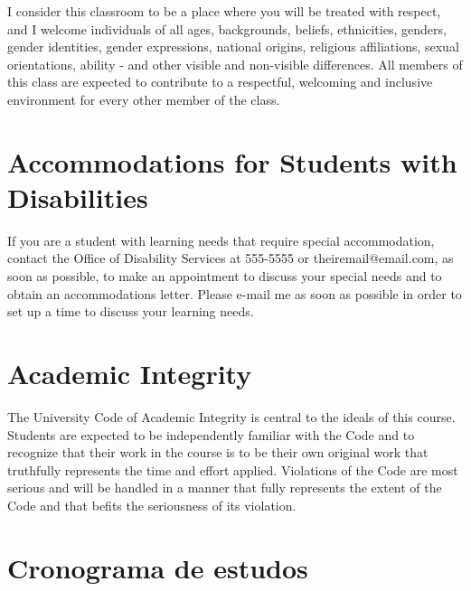 \documentclass[a4paper]{inzane_syllabus} %
\begin{document}
I consider this classroom to be a place where you will be treated with respect,
and I welcome individuals of all ages, backgrounds, beliefs, ethnicities,
genders, gender identities, gender expressions, national origins, religious
affiliations, sexual orientations, ability - and other visible and non-visible
differences. All members of this class are expected to contribute to a
respectful, welcoming and inclusive environment for every other member of
the class. 

\vspace{0.5cm}
\section{Accommodations for Students with Disabilities}

If you are a student with learning needs that require special accommodation,
contact the Office of Disability Services at 555-5555 or theiremail@email.com,
as soon as possible, to make an appointment to discuss your special needs and
to obtain an accommodations letter.  Please e-mail me as soon as possible in
order to set up a time to discuss your learning needs.

\vspace{0.5cm}
\section{Academic Integrity}

The University Code of Academic Integrity is central to the ideals of this
course. Students are expected to be independently familiar with the Code and to
recognize that their work in the course is to be their own original work that
truthfully represents the time and effort applied.  Violations of the Code are
most serious and will be handled in a manner that fully represents the extent
of the Code and that befits the seriousness of its violation.\\


\newpage
\makeFullPage
\section{Cronograma de estudos}
\end{document}
